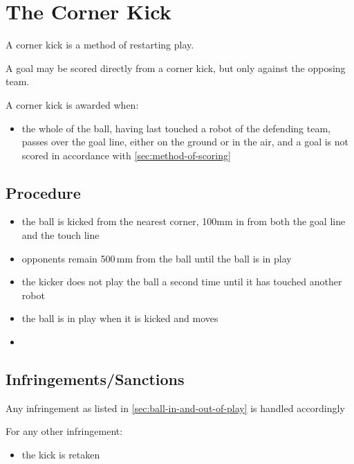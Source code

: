 \section{The Corner Kick}\label{sec:corner-kick}

A corner kick is a method of restarting play.

A goal may be scored directly from a corner kick, but only against the opposing team.

A corner kick is awarded when:

\begin{itemize}
\item the whole of the ball, having last touched a robot of the defending team, passes over the goal line, either on the ground or in the air, and a goal is not scored in accordance with \autoref{sec:method-of-scoring}
\end{itemize}

\subsection{Procedure}
\begin{itemize}
\item the ball is kicked from the nearest corner, 100\added{\,}mm in from both the goal line and the touch line
\item opponents remain 500\,mm from the ball until the ball is in play
\item the kicker does not play the ball a second time until it has touched another robot
\item the ball is in play when it is kicked and moves
\item {}
\end{itemize}

\subsection{Infringements/Sanctions}
Any infringement as listed in \autoref{sec:ball-in-and-out-of-play} is handled accordingly

For any other infringement:

\begin{itemize}
\item the kick is retaken
\end{itemize}
